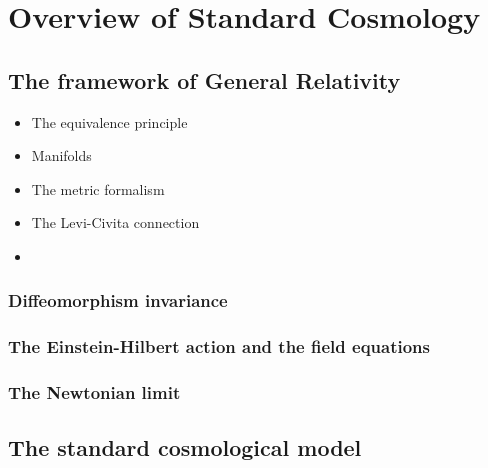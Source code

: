 
\chapter{Overview of Standard Cosmology} %

\label{Overview} %


\newcommand{\keyword}[1]{\textbf{#1}}
\newcommand{\tabhead}[1]{\textbf{#1}}
\newcommand{\code}[1]{\texttt{#1}}
\newcommand{\file}[1]{\texttt{\bfseries#1}}
\newcommand{\option}[1]{\texttt{\itshape#1}}


\section{The framework of General Relativity}

\begin{itemize}
\item The equivalence principle
\item Manifolds
\item The metric formalism
\item The Levi-Civita connection
\item 
\end{itemize}

\subsection{Diffeomorphism invariance}

\subsection{The Einstein-Hilbert action and the field equations}

\subsection{The Newtonian limit}


\section{The standard cosmological model}

